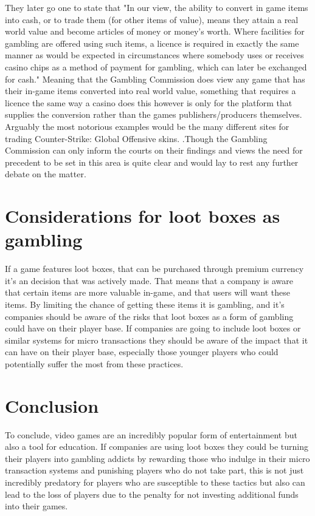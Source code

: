 \documentclass{scrartcl}
\begin{document}
They later go one to state that "In our view, the ability to convert in game items into cash, or to trade them (for other items of value), means they attain a real world value and become articles of money or money’s worth. Where facilities for gambling are offered using such items, a licence is required in exactly the same manner as would be expected in circumstances where somebody uses or receives casino chips as a method of payment for gambling, which can later be exchanged for cash." Meaning that the Gambling Commission does view any game that has their in-game items converted into real world value, something that requires a licence the same way a casino does this however is only for the platform that supplies the conversion rather than the games publishers/producers themselves. Arguably the most notorious examples would be the many different sites for trading Counter-Strike: Global Offensive \cite{valve2012CS} skins. .Though the Gambling Commission can only inform the courts on their findings and views the need for precedent to be set in this area is quite clear and would lay to rest any further debate on the matter.

\section{Considerations for loot boxes as gambling}
If a game features loot boxes, that can be purchased through premium currency it's an decision that was actively made. That means that a company is aware that certain items are more valuable in-game, and that users will want these items. By limiting the chance of getting these items it is gambling, and it's companies should be aware of the risks that loot boxes as a form of gambling could have on their player base. \cite{griffiths2000risk, johansson2009risk, chambers2003developmental} If companies are going to include loot boxes or similar systems for micro transactions they should be aware of the impact that it can have on their player base, especially those younger players who could potentially suffer the most from these practices.

\section{Conclusion}
To conclude, video games are an incredibly popular form of entertainment but also a tool for education. If companies are using loot boxes they could be turning their players into gambling addicts by rewarding those who indulge in their micro transaction systems and punishing players who do not take part, this is not just incredibly predatory for players who are susceptible to these tactics but also can lead to the loss of players due to the penalty for not investing additional funds into their games.



\end{document}
